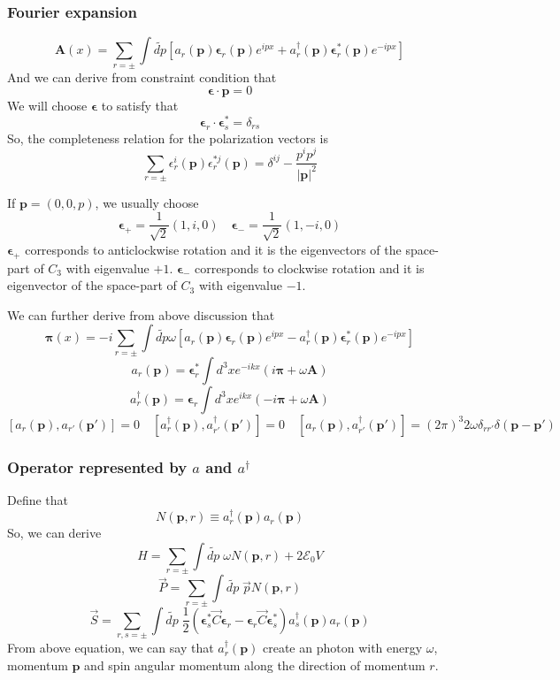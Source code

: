 \documentclass[cyan]{elegantnote}
\begin{document}
\subsubsection{Fourier expansion}
\[\bm{A}(x) = \sum_{r = \pm} \int \widetilde{dp} [a_{r}(\bm{p}) \bm{\epsilon}_r(\bm{p})e^{ipx} + a^{\dagger}_{r}(\bm{p}) \bm{\epsilon}^*_r(\bm{p})e^{-ipx}]\]
And we can derive from constraint condition that
\[\bm{\epsilon} \cdot \bm{p} = 0\]
We will choose $\bm{\epsilon}$ to satisfy that
\[\bm{\epsilon}_r \cdot \bm{\epsilon}^*_s = \delta_{rs}\]
So, the completeness relation for the polarization vectors is
\[\sum_{r=\pm} \epsilon_r^i(\bm{p}) \epsilon_r^{*j}(\bm{p}) = \delta^{ij} - \frac{p^ip^j}{|\bm{p}|^2}\]
\begin{example}
If $\bm{p} = (0,0,p)$, we usually choose 
\[\bm{\epsilon}_{+} = \frac{1}{\sqrt{2}}(1,i,0) \quad \bm{\epsilon}_{-} = \frac{1}{\sqrt{2}}(1,-i,0) \]
$\bm{\epsilon}_{+}$ corresponds to anticlockwise rotation and it is the eigenvectors of the space-part of $C_3$ with eigenvalue $+1$. $\bm{\epsilon}_{-}$ corresponds to clockwise rotation and it is eigenvector of the space-part of $C_3$ with eigenvalue $- 1$.
\end{example}
\noindent
We can further derive from above discussion that
\[\bm{\pi}(x) = -i \sum_{r = \pm} \int \widetilde{dp} \omega [a_{r}(\bm{p}) \bm{\epsilon}_r(\bm{p})e^{ipx} - a^{\dagger}_{r}(\bm{p}) \bm{\epsilon}^*_r(\bm{p})e^{-ipx}]\]
\[a_r(\bm{p}) = \bm{\epsilon}^*_r \int d^3x e^{-ikx}(i\bm{\pi}+\omega\bm{A})\]
\[a^{\dagger}_r(\bm{p}) = \bm{\epsilon}_r \int d^3x e^{ikx}(-i\bm{\pi}+\omega\bm{A})\]
\[[a_r(\bm{p}),a_{r'}(\bm{p'})] = 0 \quad [a^{\dagger}_r(\bm{p}),a^{\dagger}_{r'}(\bm{p'})] = 0 \quad [a_r(\bm{p}),a^{\dagger}_{r'}(\bm{p'})] = (2\pi)^3 2\omega \delta_{rr'} \delta(\bm{p} - \bm{p}')\]

\subsubsection{Operator represented by $a$ and $a^{\dagger}$}
\noindent
Define that
\[N(\bm{p},r) \equiv a^{\dagger}_{r}(\bm{p}) a_r(\bm{p})\]
So, we can derive
\[H = \sum_{r = \pm} \int \widetilde{dp} \; \omega N(\bm{p},r) + 2\mathcal{E}_0V\]
\[\vec{P} = \sum_{r = \pm} \int \widetilde{dp} \; \vec{p} N(\bm{p},r) \]
\[\vec{S} = \sum_{r,s = \pm} \int \widetilde{dp} \; \frac{1}{2}(\bm{\epsilon}^*_{s} \vec{C}\bm{\epsilon}_{r} - \bm{\epsilon}_{r} \vec{C}\bm{\epsilon}^*_{s}) a^{\dagger}_{s}(\bm{p}) a_r(\bm{p})\]
From above equation, we can say that $a^{\dagger}_r(\bm{p})$ create an photon with energy $\omega$, momentum $\bm{p}$ and spin angular momentum along the direction of momentum $r$.
\end{document}
